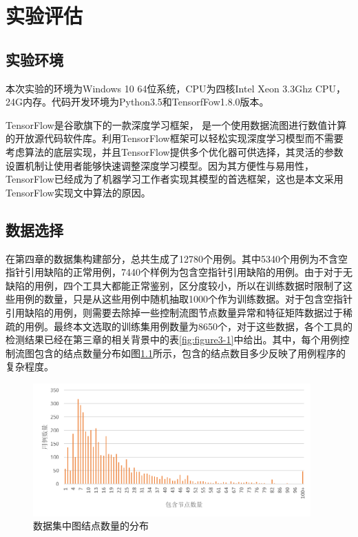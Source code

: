 \chapter{实验评估}
\section{实验环境}
本次实验的环境为Windows 10 64位系统，CPU为四核Intel Xeon 3.3Ghz CPU，24G内存。代码开发环境为Python3.5和TensorfFow1.8.0版本。

TensorFlow是谷歌旗下的一款深度学习框架， 是一个使用数据流图进行数值计算的开放源代码软件库。利用TensorFlow框架可以轻松实现深度学习模型而不需要考虑算法的底层实现，并且TensorFlow提供多个优化器可供选择，其灵活的参数设置机制让使用者能够快速调整深度学习模型。因为其方便性与易用性，TensorFlow已经成为了机器学习工作者实现其模型的首选框架，这也是本文采用TensorFlow实现文中算法的原因。

\section{数据选择}

在第四章的数据集构建部分，总共生成了12780个用例。其中5340个用例为不含空指针引用缺陷的正常用例，7440个样例为包含空指针引用缺陷的用例。由于对于无缺陷的用例，四个工具大都能正常鉴别，区分度较小，所以在训练数据时限制了这些用例的数量，只是从这些用例中随机抽取1000个作为训练数据。对于包含空指针引用缺陷的用例，则需要去除掉一些控制流图节点数量异常和特征矩阵数据过于稀疏的用例。最终本文选取的训练集用例数量为8650个，对于这些数据，各个工具的检测结果已经在第三章的相关背景中的表\ref{fig:figure3-1}中给出。其中，每个用例控制流图包含的结点数量分布如图\ref{fig:6-1}所示，包含的结点数目多少反映了用例程序的复杂程度。

\begin{figure}[htbp]
	\begin{center}
		\includegraphics[width=0.95\textwidth]{figures/data}
		\caption{数据集中图结点数量的分布}
		\label{fig:6-1}
	\end{center}
\end{figure}

